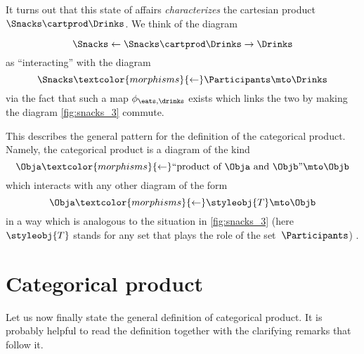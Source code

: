 \begin{figure*}[h!]
	\centering
	\caption{Choosing food and drink separately is essentially the same as choosing a combination of the two. }
	\label{fig:snacks_3}
\end{figure*}

It turns out that this state of affairs \emph{characterizes} the cartesian product $\Snacks\cartprod \Drinks$.
We think of the diagram

\begin{equation}
	\label{eq:snacks-prod-diagram}
	\Snacks \leftarrow \Snacks \cartprod \Drinks \rightarrow \Drinks
\end{equation}
as ``interacting'' with the diagram
\begin{equation}
	\label{eq:snacks-prod-test-diagram}
	\Snacks \textcolor{morphisms}{\leftarrow} \Participants \mto \Drinks
\end{equation}
via the fact that such a map $\phi_{\eats,\drinks}$ exists which links the two by making the diagram \cref{fig:snacks_3} commute.

This describes the general pattern for the definition of the categorical product.
Namely, the categorical product is a diagram of the kind
\begin{equation}
	\label{eq:prod-inline-generic-diagram}
	\Obja \textcolor{morphisms}{\leftarrow} \text{``product of } \Obja \text{ and } \Objb \text{''}  \mto \Objb
\end{equation}
which interacts with any other diagram of the form
\begin{equation}
	\label{eq:prod-inline-test-diagram}
	\Obja \textcolor{morphisms}{\leftarrow}\styleobj{T} \mto \Objb
\end{equation}
in a way which is analogous to the situation in \cref{fig:snacks_3} (here~$\styleobj{T}$ stands for any set that plays the role of the set~$\Participants$) .

\section{Categorical product}


Let us now finally state the general definition of categorical product.
It is probably helpful to read the definition together with the clarifying remarks that follow it.


